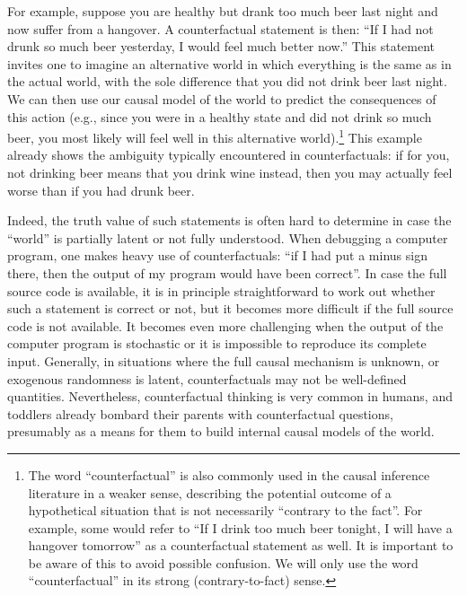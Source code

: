 For example, suppose you are healthy but drank too much beer last night and now suffer from a hangover. 
A counterfactual statement is then: ``If I had not drunk so much beer yesterday, I would feel much better now.''
This statement invites one to imagine an alternative world in which everything is the same as in the actual world,
with the sole difference that you did not drink beer last night. We can then use our causal model of the world to predict the
consequences of this action (e.g., since you were in a healthy state and did not drink so much beer, you most likely will
feel well in this alternative world).\footnote{The word ``counterfactual'' is also commonly used in the causal inference literature in a weaker sense, describing the potential outcome of a hypothetical situation that is not necessarily ``contrary to the fact''. For example, some would refer to ``If I drink too much beer tonight, I will have a hangover tomorrow'' as a counterfactual statement as well.
It is important to be aware of this to avoid possible confusion. We will only use the word ``counterfactual'' in its strong (contrary-to-fact) sense.}
This example already shows the ambiguity typically encountered in counterfactuals: if for you, not drinking beer means
that you drink wine instead, then you may actually feel worse than if you had drunk beer.

Indeed, the truth value of such statements is often hard to determine in case the ``world'' is partially latent or not
fully understood. When debugging a computer program, one makes heavy use of counterfactuals: ``if I had put a minus sign
there, then the output of my program would have been correct''. In case the full source code is available, it is in 
principle straightforward to work out whether such a statement is correct or not, but it becomes more difficult if 
the full source code is not available. It becomes even more challenging when the output of the computer program is
stochastic or it is impossible to reproduce its complete input. 
Generally, in situations where the full causal mechanism is unknown, or exogenous
randomness is latent, counterfactuals may not be well-defined quantities. Nevertheless, counterfactual thinking is 
very common in humans, and toddlers already bombard their parents with counterfactual questions, 
presumably as a means for them to build internal causal models of the world.

